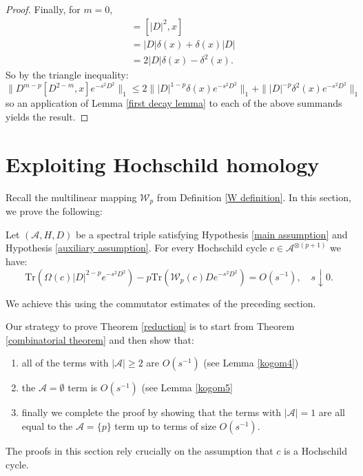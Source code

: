 \begin{proof}
        Finally, for $m=0$,
        \begin{align*}
            [D^2,x] &= [|D|^2,x]\\ 
                    &= |D|\delta(x)+\delta(x)|D|\\
                    &= 2|D|\delta(x)-\delta^2(x).
        \end{align*}
        So by the triangle inequality:
        \begin{equation*}
            \|D^{m-p}[D^{2-m},x]e^{-s^2D^2}\|_1 \leq 2\||D|^{1-p}\delta(x)e^{-s^2D^2}\|_1+\||D|^{-p}\delta^2(x)e^{-s^2D^2}\|_1
        \end{equation*}
        so an application of Lemma \ref{first decay lemma} to each of the above summands yields the result.
    \end{proof}

\section{Exploiting Hochschild homology}\label{cohomology section}
    
    Recall the multilinear mapping $\mathcal{W}_p$ from Definition \ref{W definition}. In this section, we prove the following:
    \begin{thm}\label{reduction} 
        Let $(\mathcal{A},H,D)$ be a spectral triple satisfying Hypothesis \ref{main assumption} and Hypothesis \ref{auxiliary assumption}. For every Hochschild cycle $c\in\mathcal{A}^{\otimes (p+1)}$ we have:
        \begin{equation*}
            \mathrm{Tr}(\Omega(c)|D|^{2-p}e^{-s^2D^2})-p\mathrm{Tr}(\mathcal{W}_p(c)De^{-s^2D^2}) = O(s^{-1}),\quad s\downarrow 0.
        \end{equation*}
    \end{thm}
    We achieve this using the commutator estimates of the preceding section.
    
    Our strategy to prove Theorem \ref{reduction} is to start from Theorem \ref{combinatorial theorem} and then show that:
    \begin{enumerate}
        \item{} all of the terms with $|\mathscr{A}| \geq 2$ are $O(s^{-1})$ (see Lemma \ref{kogom4})
        \item{} the $\mathscr{A} = \emptyset$ term is $O(s^{-1})$ (see Lemma \ref{kogom5}
        \item{} finally we complete the proof by showing that the terms with $|\mathscr{A}|=1$ are all equal to the $\mathscr{A}=\{p\}$ term up to terms of size $O(s^{-1})$.
    \end{enumerate}
    The proofs in this section rely crucially on the assumption that $c$ is a Hochschild cycle.
    
